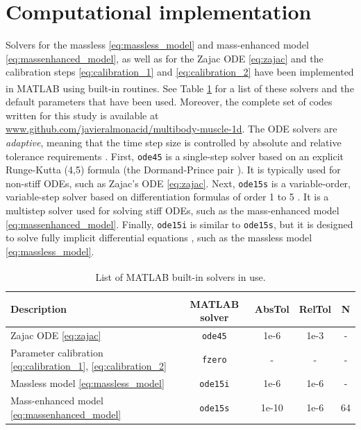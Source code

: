 \documentclass{sfuthesis}
\numberwithin{equation}{chapter}
\numberwithin{figure}{chapter}
\numberwithin{table}{chapter}
\theoremstyle{definition}
\newcommand{\matlab}{MATLAB\textsuperscript{\textcopyright} }
\begin{document}
\section{Computational implementation}

Solvers for the massless \eqref{eq:massless_model} and mass-enhanced model \eqref{eq:massenhanced_model}, as well as for the Zajac ODE \eqref{eq:zajac} and the calibration steps \eqref{eq:calibration_1} and \eqref{eq:calibration_2} have been implemented in \matlab using built-in routines. See Table \ref{tab:matlab_solvers} for a list of these solvers and the default parameters that have been used. Moreover, the complete set of codes written for this study is available at \url{www.github.com/javieralmonacid/multibody-muscle-1d}. The ODE solvers are \textit{adaptive}, meaning that the time step size is controlled by absolute and relative tolerance requirements \cite{ShampineReichelt1997}. First, \texttt{ode45} is a single-step solver based on an explicit Runge-Kutta (4,5) formula (the Dormand-Prince pair \cite{DormandPrince1980}). It is typically used for non-stiff ODEs, such as Zajac's ODE \eqref{eq:zajac}. Next, \texttt{ode15s} is a variable-order, variable-step solver based on differentiation formulas of order 1 to 5 \cite{ShampineReichelt1997}. It is a multistep solver used for solving stiff ODEs, such as the mass-enhanced model \eqref{eq:massenhanced_model}. Finally, \texttt{ode15i} is similar to \texttt{ode15s}, but it is designed to solve fully implicit differential equations \cite{Shampine2002}, such as the massless model \eqref{eq:massless_model}.

\begin{table}
    \centering
    \begin{tabular}{|l|c|c|c|c|}\hline
        Description & \matlab solver & AbsTol & RelTol & N \\\hline
        Zajac ODE \eqref{eq:zajac} & \texttt{ode45} & 1e-6 & 1e-3 & - \\\hline
        Parameter calibration \eqref{eq:calibration_1}, \eqref{eq:calibration_2} & \texttt{fzero} & - & - & - \\\hline
        Massless model \eqref{eq:massless_model} & \texttt{ode15i} & 1e-6 & 1e-6 & - \\\hline
        Mass-enhanced model \eqref{eq:massenhanced_model} & \texttt{ode15s} & 1e-10 & 1e-6 & 64 \\\hline
    \end{tabular}
    \caption{List of \matlab built-in solvers in use.}
    \label{tab:matlab_solvers}
\end{table}
\end{document}
